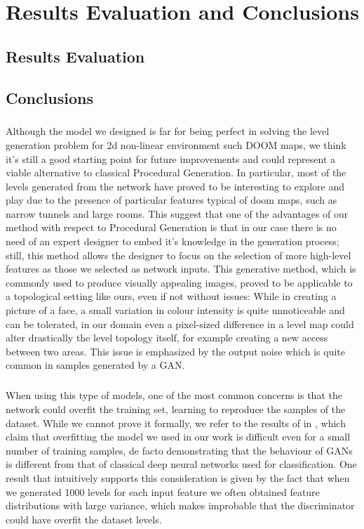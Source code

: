 \chapter{Results Evaluation and Conclusions}
\section{Results Evaluation}


\section{Conclusions}
\paragraph{} Although the model we designed is far for being perfect in solving the level generation problem for 2d non-linear environment such DOOM maps, we think it's still a good starting point for future improvements and could represent a viable alternative to classical Procedural Generation. In particular, most of the levels generated from the network have proved to be interesting to explore and play due to the presence of particular features typical of doom maps, such as narrow tunnels and large rooms. This suggest that one of the advantages of our method with respect to Procedural Generation is that in our case there is no need of an expert designer to embed it's knowledge in the generation process; still, this method allows the designer to focus on the selection of more high-level features as those we selected as network inputs. This generative method, which is commonly used to produce visually appealing images, proved to be applicable to a topological setting like ours, even if not without issues: While in creating a picture of a face, a small variation in colour intensity is quite unnoticeable and can be tolerated, in our domain even a pixel-sized difference in a level map could alter drastically the level topology itself, for example creating a new access between two areas. This issue is emphasized by the output noise which is quite common in samples generated by a GAN.

\paragraph{} When using this type of models, one of the most common concerns is that the network could overfit the training set, learning to reproduce the samples of the dataset. While we cannot prove it formally, we refer to the results of \citeauthor{empiricalevaluation} in \cite[Appendix~C]{empiricalevaluation}, which claim that overfitting the model we used in our work is difficult even for a small number of training samples, de facto demonstrating that the behaviour of GANs is different from that of classical deep neural networks used for classification. One result that intuitively supports this consideration is given by the fact that when we generated 1000 levels for each input feature we often obtained feature distributions with large variance, which makes improbable that the discriminator could have overfit the dataset levels.



